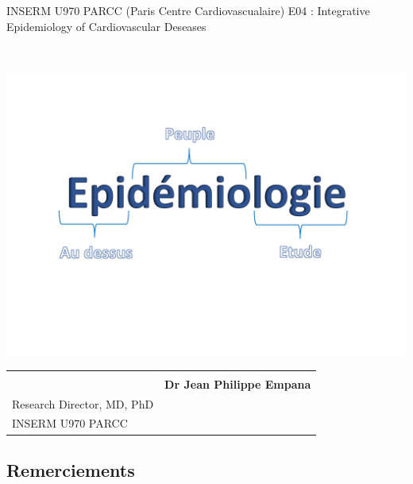 \documentclass{book}
\makeatletter
\let\myauthor\@author
\let\mydate\@date
\makeatother
\begin{document}
\begin{titlepage}
\begin{minipage}\linewidth
        \centering\sffamily
        \normalsize{INSERM U970 PARCC (Paris Centre Cardiovascualaire)}
        \vskip3pt 
        E04 : Integrative Epidemiology of Cardiovascular Deseases\\
    \end{minipage}
    
\begin{center}
\normalsize{\textbf{\mydate}}\\
\end{center}

\bigskip
\begin{center}
\includegraphics[scale= .1]{Epidemiologie_logo_im.png}
\end{center}


\begin{tabular}{p{}p{}}
\flushleft \myauthor \\ 
& \flushright \textbf{Dr Jean Philippe Empana} \\ Research Director, MD, PhD \\ INSERM U970 PARCC
\end{tabular}


\end{titlepage}
 
\frontmatter

\tableofcontents

\newpage
\begin{center}
\section*{Remerciements}
\end{center}
\bigskip
\end{document}
